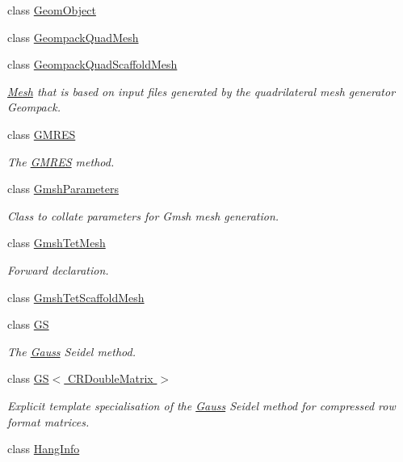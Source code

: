 \begin{DoxyCompactItemize}
\item 
class \hyperlink{classoomph_1_1GeomObject}{Geom\+Object}
\item 
class \hyperlink{classoomph_1_1GeompackQuadMesh}{Geompack\+Quad\+Mesh}
\item 
class \hyperlink{classoomph_1_1GeompackQuadScaffoldMesh}{Geompack\+Quad\+Scaffold\+Mesh}
\begin{DoxyCompactList}\small\item\em \hyperlink{classoomph_1_1Mesh}{Mesh} that is based on input files generated by the quadrilateral mesh generator Geompack. \end{DoxyCompactList}\item 
class \hyperlink{classoomph_1_1GMRES}{G\+M\+R\+ES}
\begin{DoxyCompactList}\small\item\em The \hyperlink{classoomph_1_1GMRES}{G\+M\+R\+ES} method. \end{DoxyCompactList}\item 
class \hyperlink{classoomph_1_1GmshParameters}{Gmsh\+Parameters}
\begin{DoxyCompactList}\small\item\em Class to collate parameters for Gmsh mesh generation. \end{DoxyCompactList}\item 
class \hyperlink{classoomph_1_1GmshTetMesh}{Gmsh\+Tet\+Mesh}
\begin{DoxyCompactList}\small\item\em Forward declaration. \end{DoxyCompactList}\item 
class \hyperlink{classoomph_1_1GmshTetScaffoldMesh}{Gmsh\+Tet\+Scaffold\+Mesh}
\item 
class \hyperlink{classoomph_1_1GS}{GS}
\begin{DoxyCompactList}\small\item\em The \hyperlink{classoomph_1_1Gauss}{Gauss} Seidel method. \end{DoxyCompactList}\item 
class \hyperlink{classoomph_1_1GS_3_01CRDoubleMatrix_01_4}{G\+S$<$ C\+R\+Double\+Matrix $>$}
\begin{DoxyCompactList}\small\item\em Explicit template specialisation of the \hyperlink{classoomph_1_1Gauss}{Gauss} Seidel method for compressed row format matrices. \end{DoxyCompactList}\item 
class \hyperlink{classoomph_1_1HangInfo}{Hang\+Info}

\end{DoxyCompactItemize}

